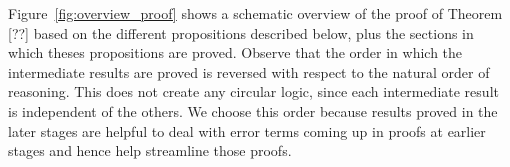 Figure~\ref{fig:overview_proof} shows a schematic overview of the proof of Theorem [??] based on the different propositions described below, plus the sections in which theses propositions are proved. Observe that the order in which the intermediate results are proved is reversed with respect to the natural order of reasoning. This does not create any circular logic, since each intermediate result is independent of the others. We choose this order because results proved in the later stages are helpful to deal with error terms coming up in proofs at earlier stages and hence help streamline those proofs. 

\begin{figure}[!t]
\centering

\end{figure}
